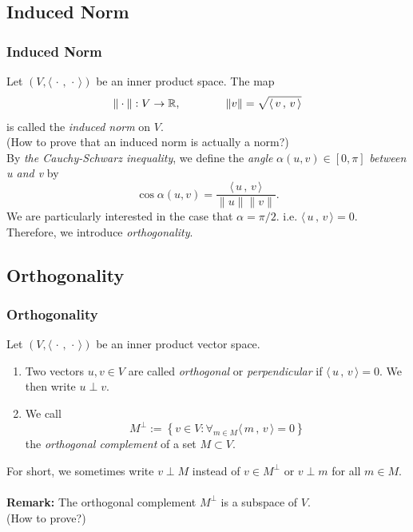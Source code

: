\documentclass{beamer}
\renewcommand{\emph}[1]{{\color{Turquoise3}\textsl{#1}}}
\newcommand{\nullspace}{~\\[15pt]}
\newcommand{\remark}{\textbf{Remark: }}
\newcommand{\scp}[2]{\langle\,#1\,,\,#2\,\rangle} \newcommand{\scpp}{\langle\,\cdot\,,\,\cdot\,\rangle}
\begin{document}
\subsection{Induced Norm}
\begin{frame}
    \frametitle{Induced Norm}
    Let $(V,\scpp)$ be an inner product space. The map
    \[\|\cdot\|:V\rightarrow\R,\qquad\qquad\|v\|=\sqrt{\scp{v}{v}}\]
    is called the \emph{induced norm} on $V$.
    \nullspace
    (How to prove that an induced norm is actually a norm?)
    \nullspace
    By \textit{the Cauchy-Schwarz inequality}, we define the \emph{angle} $\alpha(u,v)\in[0,\pi]$ \emph{between u and v} by
    \begin{equation}
        \cos\alpha(u,v)=\frac{\scp{u}{v}}{\|u\|\|v\|}.
    \end{equation}
    We are particularly interested in the case that $\alpha=\pi/2$. i.e. $\scp{u}{v}=0$. Therefore, we introduce \emph{orthogonality}.
\end{frame}

\subsection{Orthogonality}
\begin{frame}[allowframebreaks]
    \frametitle{Orthogonality}
    Let $(V,\scpp)$ be an inner product vector space.
    \begin{enumerate}[1.]
        \item Two vectors $u,v\in V$ are called \emph{orthogonal} or \emph{perpendicular} if $\scp{u}{v}=0$. We then write $u\perp v$.
        \item We call
              \begin{equation*}
                  M^{\perp}:=\left\{v\in V:\mathop{\forall}_{m\in M}\scp{m}{v}=0\right\}
              \end{equation*}
              the \emph{orthogonal complement} of a set $M\subset V$.
    \end{enumerate}
    For short, we sometimes write $v\perp M$ instead of $v\in M^{\perp}$ or $v\perp m$ for all $m\in M$.
    \nullspace
    \remark The orthogonal complement $M^{\perp}$ is a subspace of $V$.\\
    (How to prove?)
\end{frame}
\end{document}
